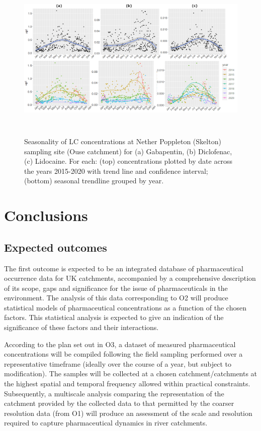 \documentclass{article}
\begin{document}
\begin{figure}[h]
    \centering
    \includegraphics[height=8cm]{fig_seasonality.png}
    \caption{Seasonality of LC concentrations at Nether Poppleton (Skelton) sampling site (Ouse catchment) for (a) Gabapentin, (b) Diclofenac, (c) Lidocaine. For each: (top) concentrations plotted by date across the years 2015-2020 with trend line and confidence interval; (bottom) seasonal trendline grouped by year.}
    \label{fig_ouse_site_seasonality}
\end{figure}

\clearpage
\section{Conclusions}

\subsection{Expected outcomes}
The first outcome is expected to be an integrated database of pharmaceutical occurrence data for UK catchments, accompanied by a comprehensive description of its scope, gaps and significance for the issue of pharmaceuticals in the environment. The analysis of this data corresponding to O2 will produce statistical models of pharmaceutical concentrations as a function of the chosen factors. This statistical analysis is expected to give an indication of the significance of these factors and their interactions. 

According to the plan set out in O3, a dataset of measured pharmaceutical concentrations will be compiled following the field sampling performed over a representative timeframe (ideally over the course of a year, but subject to modification). The samples will be collected at a chosen catchment/catchments at the highest spatial and temporal frequency allowed within practical constraints. Subsequently, a multiscale analysis comparing the representation of the catchment provided by the collected data to that permitted by the coarser resolution data (from O1) will produce an assessment of the scale and resolution required to capture pharmaceutical dynamics in river catchments.
\end{document}
